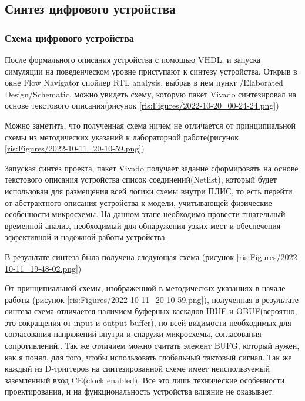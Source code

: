 \begin{sloppypar}
\newpage %
\subsection{Синтез цифрового устройства} %
\subsubsection{Схема цифрового устройства} %

После формального описания устройства с помощью VHDL, и запуска симуляции на поведенческом уровне приступают к синтезу устройства. Открыв в окне Flow Navigator спойлер RTL analysis, выбрав в нем пункт /Elaborated Design/Schematic, можно увидеть схему, которую пакет Vivado синтезировал на основе текстового описания(рисунок \ref{ris:Figures/2022-10-20_00-24-24.png})


Можно заметить, что полученная схема ничем не отличается от принципиальной схемы из методических указаний к лабораторной работе(рисунок \ref{ris:Figures/2022-10-11_20-10-59.png})

Запуская синтез проекта, пакет Vivado получает задание сформировать на основе текстового описания устройства список соединений(Netlist), который будет использован для размещения всей логики схемы внутри ПЛИС, то есть перейти от абстрактного описания устройства к модели, учитывающей физические особенности микросхемы. На данном этапе необходимо провести тщательный временной анализ, необходимый для обнаружения узких мест и обеспечения эффективной и надежной работы устройства. 

В результате синтеза была получена следующая схема (рисунок \ref{ris:Figures/2022-10-11_19-48-02.png})


От принципиальной схемы, изображенной в методических указаниях в начале работы (рисунок \ref{ris:Figures/2022-10-11_20-10-59.png}), полученная в результате синтеза схема отличается наличием буферных каскадов IBUF и OBUF(вероятно, это сокращения от input и output buffer), по всей видимости необходимых для согласования напряжений внутри и снаружи микросхемы, согласования сопротивлений.. Так же отличием можно считать элемент BUFG, который нужен, как я понял, для того, чтобы использовать глобальный тактовый сигнал. Так же каждый из D-триггеров на синтезированной схеме имеет неиспользуемый заземленный вход CE(clock enabled). Все это лишь технические особенности проектирования, и на функциональность устройства влияние не оказывает.
\newpage

\end{sloppypar}
